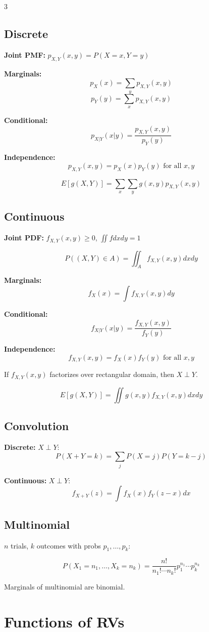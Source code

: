 \documentclass[10pt,landscape]{article}
\begin{document}
\begin{multicols}{3}
\subsection{Discrete}
\textbf{Joint PMF:} $p_{X,Y}(x, y) = P(X = x, Y = y)$

\textbf{Marginals:}
$$p_X(x) = \sum_y p_{X,Y}(x, y)$$
$$p_Y(y) = \sum_x p_{X,Y}(x, y)$$

\textbf{Conditional:}
$$p_{X|Y}(x|y) = \frac{p_{X,Y}(x, y)}{p_Y(y)}$$

\textbf{Independence:}
$$p_{X,Y}(x, y) = p_X(x) p_Y(y) \text{ for all } x, y$$

$$E[g(X, Y)] = \sum_x \sum_y g(x, y) p_{X,Y}(x, y)$$

\subsection{Continuous}
\textbf{Joint PDF:} $f_{X,Y}(x, y) \geq 0$, $\iint f dxdy = 1$

$$P((X, Y) \in A) = \iint_A f_{X,Y}(x, y) dxdy$$

\textbf{Marginals:}
$$f_X(x) = \int f_{X,Y}(x, y) dy$$

\textbf{Conditional:}
$$f_{X|Y}(x|y) = \frac{f_{X,Y}(x, y)}{f_Y(y)}$$

\textbf{Independence:}
$$f_{X,Y}(x, y) = f_X(x) f_Y(y) \text{ for all } x, y$$

If $f_{X,Y}(x, y)$ factorizes over rectangular domain, then $X \perp Y$.

$$E[g(X, Y)] = \iint g(x, y) f_{X,Y}(x, y) dxdy$$

\subsection{Convolution}
\textbf{Discrete:} $X \perp Y$:
$$P(X + Y = k) = \sum_j P(X = j) P(Y = k - j)$$

\textbf{Continuous:} $X \perp Y$:
$$f_{X+Y}(z) = \int f_X(x) f_Y(z - x) dx$$

\subsection{Multinomial}
$n$ trials, $k$ outcomes with probs $p_1, \ldots, p_k$:

$$P(X_1 = n_1, \ldots, X_k = n_k) = \frac{n!}{n_1! \cdots n_k!} p_1^{n_1} \cdots p_k^{n_k}$$

Marginals of multinomial are binomial.

\section{Functions of RVs}


\end{multicols}
\end{document}
